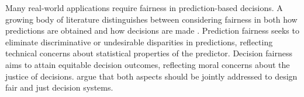 \documentclass[ijoc,sglanonrev]{informs4}
\begin{document}
Many real-world applications require fairness in prediction-based decisions. A growing body of literature distinguishes between considering fairness in both how predictions are obtained and how decisions are made \citep{paulus2020predictably,kuppler2022fair,scantamburlo2024prediction}. Prediction fairness seeks to eliminate discriminative or undesirable disparities in predictions, reflecting technical concerns about statistical properties of the predictor. Decision fairness aims to attain equitable decision outcomes, reflecting moral concerns about the justice of decisions. \cite{kuppler2022fair} argue that both aspects should be jointly addressed to design fair and just decision systems.
\end{document}
